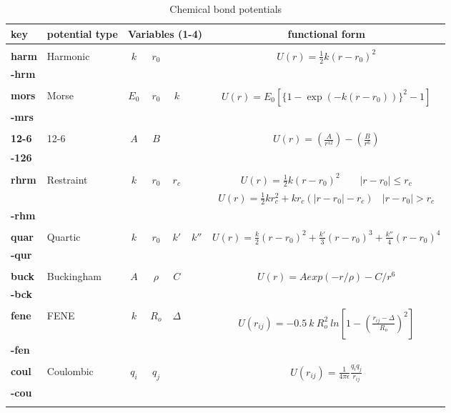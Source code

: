 \begin{enumerate}
\begin{table}[ht]
 \caption{\label{bondtable} Chemical bond potentials}     
\vskip 5pt
 \begin{centering}
 \begin{tabular}{|l|l|c|c|c|c|c|}
\hline
key & potential type &
\multicolumn{4}{c|}{Variables (1-4)} & functional form\\
\hline
 &  &  &  &  &  &  \\
{\bf harm} & Harmonic & $k$ & $r_{0}$ & & & $ U(r)=\frac{1}{2}k(r-r_{0})^2$ \\
{\bf -hrm} &  &  &  &  &  &  \\
 &  &  &  &  &  &  \\
{\bf mors} & Morse & $E_{0}$ & $r_{0}$ & $k$& &$U(r)=E_{0}[\{1-\exp(-k(r-r_{0}))\}^{2}-1]$\\ 
{\bf -mrs} &  &  &  &  & &  \\
 &  &  &  &  &  &  \\
{\bf 12-6} &12-6 & $A$ & $B$ &  &  & $U(r)=\left
(\frac{A}{r^{12}}\right)-\left(\frac{B}{r^{6}}\right)$\\
{\bf -126} &  &  &  &  &  &  \\
 &  &  &  &  &  &  \\
{\bf rhrm} & Restraint & $k$ &$r_{0}$ & $r_{c}$ & &
$U(r)=\frac{1}{2}k(r-r_{0})^2~~~~~~~~~|r-r_{0}|\le r_{c}$\\
  &  &  &  &  &  & $U(r)=\frac{1}{2}kr_{c}^2+kr_{c}(|r-r_{0}|-r_{c})~~~~|r-r_{0}|>r_{c}$\\
{\bf -rhm} &  &  &  &  &  &  \\
 &  &  &  &  &  &  \\
{\bf quar} & Quartic & $k$ & $r_{0}$ & $k'$ & $k''$ & $U(r)=\frac{k}{2}(r
-r_{0})^2+\frac{k'}{3}(r-r_{0})^3+\frac{k''}{4}(r-r_{0})^4$\\
{\bf -qur} &  &  &  &  &  &  \\
 &  &  &  &  &  &  \\
{\bf buck} & Buckingham & $A$ & $\rho$ & $C$  &  & $U(r)=Aexp(-r/\rho)-C/r^{6}$\\
{\bf -bck} &  &  &  &  &  &  \\
 &  &  &  &  &  &  \\
{\bf fene} & FENE & $k$ & $R_{o}$ & $\Delta$  &  & $U(r_{ij}) = 
-0.5~k~R_{o}^{2}~ln\left[1-\left(\frac{r_{ij}-\Delta}{R_{o}}\right)^{2}\right] $
\\
{\bf -fen} &  &  &  &  &  &  \\
 &  &  &  &  &  &  \\
{\bf coul} & Coulombic & $q_{i}$ & $q_{j}$  &  &  & $U(r_{ij}) = \frac{1}{4 \pi \epsilon}\frac{q_{i}q_{j}}{r_{ij}}$\\
{\bf -cou} &  &  &  &  &  &  \\
 &  &  &  &  &  &  \\
\hline
\end{tabular}


\end{centering}
\end{table}
\end{enumerate}
